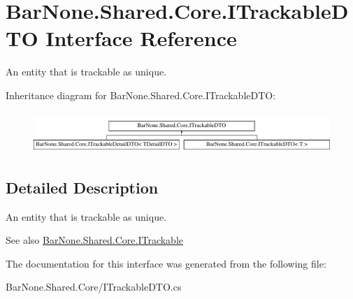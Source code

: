 \hypertarget{interface_bar_none_1_1_shared_1_1_core_1_1_i_trackable_d_t_o}{}\section{Bar\+None.\+Shared.\+Core.\+I\+Trackable\+D\+TO Interface Reference}
\label{interface_bar_none_1_1_shared_1_1_core_1_1_i_trackable_d_t_o}


An entity that is trackable as unique.  


Inheritance diagram for Bar\+None.\+Shared.\+Core.\+I\+Trackable\+D\+TO\+:\begin{figure}[H]
\begin{center}
\leavevmode
\includegraphics[height=1.568627cm]{interface_bar_none_1_1_shared_1_1_core_1_1_i_trackable_d_t_o}
\end{center}
\end{figure}


\subsection{Detailed Description}
An entity that is trackable as unique. 

\begin{DoxySeeAlso}{See also}
\mbox{\hyperlink{interface_bar_none_1_1_shared_1_1_core_1_1_i_trackable}{Bar\+None.\+Shared.\+Core.\+I\+Trackable}}


\end{DoxySeeAlso}


The documentation for this interface was generated from the following file\+:\begin{DoxyCompactItemize}
\item 
Bar\+None.\+Shared.\+Core/I\+Trackable\+D\+T\+O.\+cs\end{DoxyCompactItemize}
